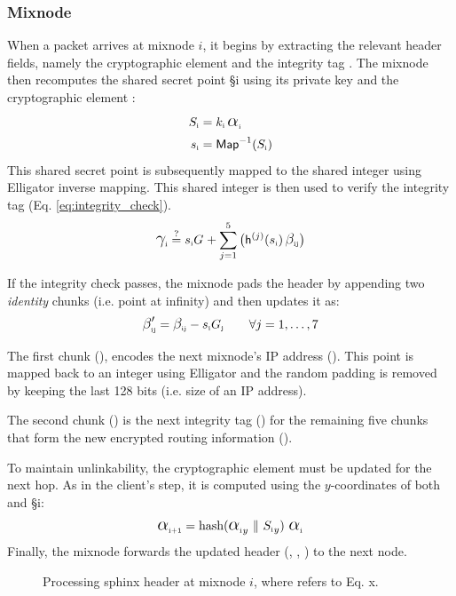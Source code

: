 \subsubsection{Mixnode}

When a packet arrives at mixnode $i$, it begins by extracting the relevant header fields, namely the cryptographic element  and the integrity tag .  
The mixnode then recomputes the shared secret point \S{i} using its private key  and the cryptographic element :  
\begin{equation}
\begin{aligned}
    \S{i} &= \sk{i} \, \A{i} \\
    \s{i} &= \InverseMap{\S{i}}\\
\end{aligned}
\label{eq:derive_secret}
\end{equation}
This shared secret point is subsequently mapped to the shared integer  using Elligator inverse mapping.
This shared integer is then used to verify the integrity tag (Eq. \ref{eq:integrity_check}).
\begin{equation}
\C{i} \overset{\text{?}}{=} \sG{i}{} + \sum_{j=1}^{5} \big( \hashIt{\s{i}}{j} \, \B{i}{j} \big)
\label{eq:integrity_check}
\end{equation}

\noindent If the integrity check passes, the mixnode pads the header by appending two \textit{identity} chunks (i.e. point at infinity) and then updates it as:
\begin{equation}
{\BB{i}{j}} = \B{i}{j} - \sG{i}{j} \qquad \forall j = 1, \dots, 7
\label{eq:decrypt}
\end{equation}

The first chunk ({}), encodes the next mixnode’s IP address (). 
This point is mapped back to an integer using Elligator and the random padding is removed by keeping the last 128 bits (i.e. size of an IP address).

\noindent The second chunk ({}) is the next integrity tag () for the remaining five chunks that form the new encrypted routing information ().

To maintain unlinkability, the cryptographic element  must be updated for the next hop. 
As in the client's step, it is computed using the $y$-coordinates of both  and \S{i}:
\begin{equation}
\A{i+1} = \text{hash}({\A{i}}_y \ \| \ {\S{i}}_y) \ \A{i}
\label{eq:update_alpha}
\end{equation}
Finally, the mixnode forwards the updated header (, , ) to the next node.

\begin{figure}[H]
    \centering
    \resizebox{0.9\linewidth}{!}{}
    \caption{Processing sphinx header at mixnode $i$, where \eq[x] refers to Eq. x.}
    \label{fig:mixnode_decryption}
\end{figure}
